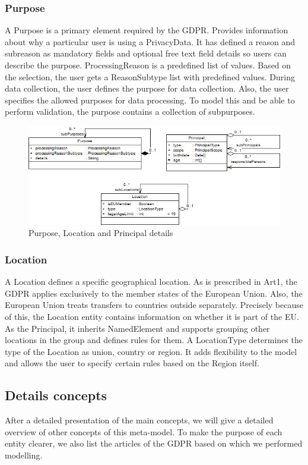 \documentclass[11pt,english]{article}
\begin{document}
\subsubsection{Purpose}
A Purpose is a primary element required by the GDPR. Provides information about why a particular user is using a PrivacyData. It has defined a reason and subreason as mandatory fields and optional free text field details so users can describe the purpose. ProcessingReason is a predefined list of values. Based on the selection, the user gets a ReasonSubtype list with predefined values. During data collection, the user defines the purpose for data collection. Also, the user specifies the allowed purposes for data processing. To model this and be able to perform validation, the purpose contains a collection of subpurposes. 
\begin{figure}
    \centering
    \includegraphics[width=12.5cm]{images/purposeAndPrincipal.jpg}
    \caption{Purpose, Location and Principal details}
    \label{fig:purpose}
\end{figure}
\subsubsection{Location}
A Location defines a specific geographical location. As is prescribed in Art1, the GDPR applies exclusively to the member states of the European Union. Also, the European Union treats transfers to countries outside separately. Precisely because of this, the Location entity contains information on whether it is part of the EU. As the Principal, it inherits NamedElement and supports grouping other locations in the group and defines rules for them. A LocationType determines the type of the Location as union, country or region. It adds flexibility to the model and allows the user to specify certain rules based on the  Region itself.
\subsection{Details concepts}
After a detailed presentation of the main concepts, we will give a detailed overview of other concepts of this meta-model. To make the purpose of each entity clearer, we also list the articles of the GDPR based on which we performed modelling.
\end{document}
